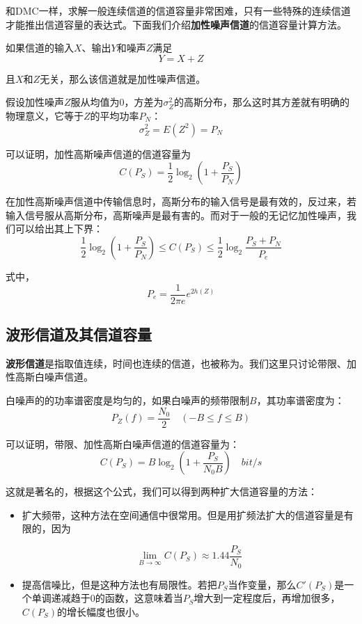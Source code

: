 \documentclass[UTF8,a4paper,11pt]{article}
\begin{document}
和DMC一样，求解一般连续信道的信道容量非常困难，只有一些特殊的连续信道才能推出信道容量的表达式。下面我们介绍\textbf{加性噪声信道}的信道容量计算方法。

如果信道的输入$X$、输出$Y$和噪声$Z$满足
\begin{equation}
Y=X+Z
\end{equation}

且$X$和$Z$无关，那么该信道就是加性噪声信道。

假设加性噪声$Z$服从均值为0，方差为$\sigma^2_Z$的高斯分布，那么这时其方差就有明确的物理意义，它等于$Z$的平均功率$P_N$：
\begin{equation}
\sigma^2_Z=E(Z^2)=P_N
\end{equation}

可以证明，加性高斯噪声信道的信道容量为
\begin{equation}
C(P_S)=\frac{1}{2}\log_{2}{(1+\frac{P_S}{P_N})}
\end{equation}

在加性高斯噪声信道中传输信息时，高斯分布的输入信号是最有效的，反过来，若输入信号服从高斯分布，高斯噪声是最有害的。而对于一般的无记忆加性噪声，我们可以给出其上下界：
\begin{equation}
\frac{1}{2}\log_{2}{(1+\frac{P_S}{P_N})}\le C(P_S)\le\frac{1}{2}\log_{2}{\frac{P_S+P_N}{P_e}}
\end{equation}

式中，
\begin{equation}
P_e=\frac{1}{2\pi e}e^{2h(Z)}
\end{equation}

\subsection{波形信道及其信道容量}
\textbf{波形信道}是指取值连续，时间也连续的信道，也被称为。我们这里只讨论带限、加性高斯白噪声信道。

白噪声的的功率谱密度是均匀的，如果白噪声的频带限制$B$，其功率谱密度为：
\begin{equation}
P_Z(f)=\frac{N_0}{2}\quad(-B\le f\le B)
\end{equation}

可以证明，带限、加性高斯白噪声信道的信道容量为：
\begin{equation}
C(P_S)=B\log_{2}{(1+\frac{P_S}{N_0B})}\quad bit/s
\end{equation}

这就是著名的，根据这个公式，我们可以得到两种扩大信道容量的方法：
\begin{itemize}
\item 扩大频带，这种方法在空间通信中很常用。但是用扩频法扩大的信道容量是有限的，因为

\begin{equation}
\lim_{B \to \infty}C(P_S)\approx 1.44\frac{P_S}{N_0}
\end{equation}

\item 提高信噪比，但是这种方法也有局限性。若把$P_S$当作变量，那么$C'(P_S)$是一个单调递减趋于0的函数，这意味着当$P_S$增大到一定程度后，再增加很多，$C(P_S)$的增长幅度也很小。
\end{itemize}
\end{document}
